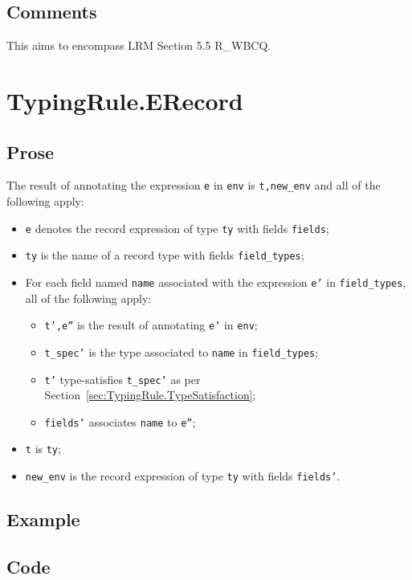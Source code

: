 \documentclass{book}
\begin{document}
\subsection{Comments}
  This aims to encompass LRM Section 5.5 R\_WBCQ.

\section{TypingRule.ERecord \label{sec:TypingRule.ERecord}}

  \subsection{Prose}
  The result of annotating the expression \texttt{e} in \texttt{env} is
\texttt{t,new\_env} and all of the following apply:
  \begin{itemize}
  \item \texttt{e} denotes the record expression of type \texttt{ty} with fields \texttt{fields};
  \item \texttt{ty} is the name of a record type with fields \texttt{field\_types};
  \item For each field named \texttt{name} associated with the expression \texttt{e'} in
    \texttt{field\_types}, all of the following apply:
    \begin{itemize}
    \item \texttt{t',e''} is the result of annotating \texttt{e'} in \texttt{env};
    \item \texttt{t\_spec'} is the type associated to \texttt{name} in \texttt{field\_types};
    \item \texttt{t'} type-satisfies \texttt{t\_spec'} as per Section~\ref{sec:TypingRule.TypeSatisfaction};
    \item \texttt{fields'} associates \texttt{name} to \texttt{e''};
    \end{itemize}
  \item \texttt{t} is \texttt{ty};
  \item \texttt{new\_env} is the record expression of type \texttt{ty} with fields \texttt{fields'}.
  \end{itemize}

  \subsection{Example}

  \subsection{Code}
\end{document}
